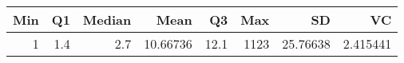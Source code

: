 
\begin{tabular}[t]{rrrrrrrr}
\toprule
Min & Q1 & Median & Mean & Q3 & Max & SD & VC\\
\midrule
1 & 1.4 & 2.7 & 10.66736 & 12.1 & 1123 & 25.76638 & 2.415441\\
\bottomrule
\end{tabular}